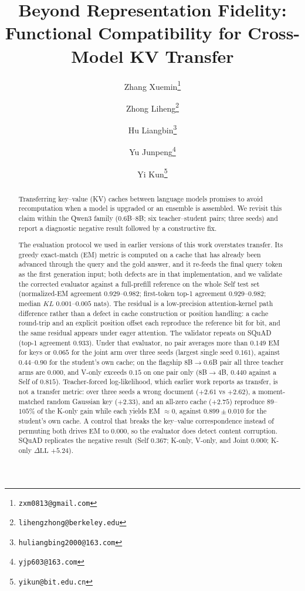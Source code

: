 \documentclass[11pt]{article}
\title{Beyond Representation Fidelity: \\
Functional Compatibility for Cross-Model KV Transfer}
\author{%
  Zhang Xuemin\thanks{\texttt{zxm0813@gmail.com}}
  \and Zhong Liheng\thanks{\texttt{lihengzhong@berkeley.edu}}
  \and Hu Liangbin\thanks{\texttt{huliangbing2000@163.com}}
  \and Yu Junpeng\thanks{\texttt{yjp603@163.com}}
  \and Yi Kun\thanks{\texttt{yikun@bit.edu.cn}}%
}
\date{}
\newcommand{\dll}{\Delta\text{LL}}
\begin{document}
\maketitle

\begin{abstract}
Transferring key--value (KV) caches between language models promises to avoid
recomputation when a model is upgraded or an ensemble is assembled. We revisit
this claim within the Qwen3 family ($0.6$B--$8$B; six teacher--student pairs;
three seeds) and report a diagnostic negative result followed by a constructive
fix.

The evaluation protocol we used in earlier versions of this work overstates
transfer. Its greedy exact-match (EM) metric is computed on a cache that has
already been advanced through the query and the gold answer, and it re-feeds the
final query token as the first generation input; both defects are in that
implementation, and we validate the corrected evaluator against a full-prefill
reference on the whole Self test set (normalized-EM agreement
$0.929$--$0.982$; first-token top-1 agreement $0.929$--$0.982$; median $KL$
$0.001$--$0.005$ nats). The residual is a low-precision attention-kernel path
difference rather than a defect in cache construction or position handling: a
cache round-trip and an explicit position offset each reproduce the reference
bit for bit, and the same residual appears under eager attention. The validator
repeats on SQuAD (top-1 agreement $0.933$). Under that evaluator, no pair
averages more than $0.149$ EM for keys or
$0.065$ for the joint arm over three seeds (largest single seed $0.161$),
against
$0.44$--$0.90$ for the student's own cache; on the flagship $8$B$\to0.6$B pair
all three teacher arms are $0.000$, and V-only exceeds $0.15$ on one pair only
($8$B$\to4$B, $0.440$ against a Self of $0.815$). Teacher-forced
log-likelihood, which earlier work reports as transfer, is not a transfer
metric: over three seeds a wrong document ($+2.61$ vs $+2.62$), a
moment-matched random Gaussian key ($+2.33$), and an all-zero cache ($+2.75$)
reproduce $89$--$105\%$ of the K-only gain while each yields EM $\approx 0$,
against $0.899\pm0.010$ for the student's own cache. A control that breaks the
key--value correspondence instead of permuting both drives EM to $0.000$, so the
evaluator does detect content corruption. SQuAD replicates
the negative result (Self $0.367$; K-only, V-only, and Joint $0.000$; K-only
$\dll$ $+5.24$).


\end{abstract}
\end{document}
